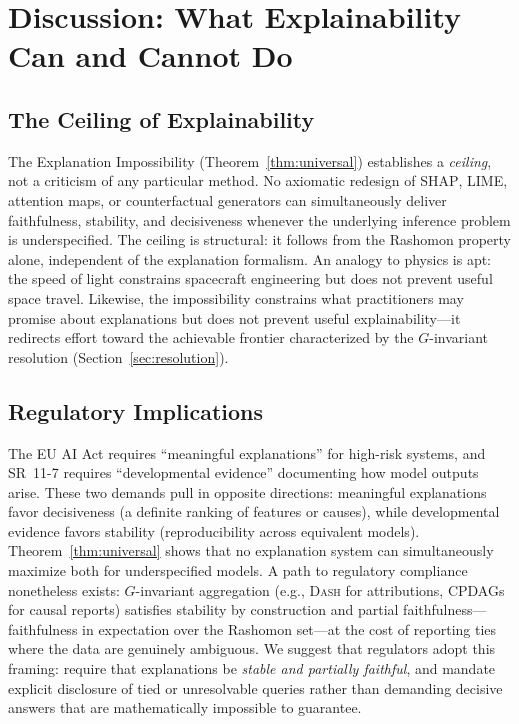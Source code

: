 \documentclass[twoside]{jmlr}
\newcommand{\SHAP}{\textsc{SHAP}}
\newcommand{\DASH}{\textsc{Dash}}
\begin{document}
\section{Discussion: What Explainability Can and Cannot Do}
\label{sec:discussion}

\subsection{The Ceiling of Explainability}
\label{sec:ceiling}

The Explanation Impossibility (Theorem~\ref{thm:universal}) establishes
a \emph{ceiling}, not a criticism of any particular method.  No axiomatic
redesign of \SHAP{}, LIME, attention maps, or counterfactual generators can
simultaneously deliver faithfulness, stability, and decisiveness whenever the
underlying inference problem is underspecified.  The ceiling is structural: it
follows from the Rashomon property alone, independent of the explanation
formalism.  An analogy to physics is apt: the speed of light constrains
spacecraft engineering but does not prevent useful space travel.  Likewise, the
impossibility constrains what practitioners may promise about explanations but
does not prevent useful explainability---it redirects effort toward the
achievable frontier characterized by the $G$-invariant resolution
(Section~\ref{sec:resolution}).

\subsection{Regulatory Implications}
\label{sec:regulatory}

The EU AI Act \citep{euaiact2024} requires ``meaningful explanations'' for
high-risk systems, and SR~11-7 \citep{occ2011sr117} requires ``developmental
evidence'' documenting how model outputs arise.  These two demands pull in
opposite directions: meaningful explanations favor decisiveness (a definite
ranking of features or causes), while developmental evidence favors stability
(reproducibility across equivalent models).  Theorem~\ref{thm:universal} shows
that no explanation system can simultaneously maximize both for underspecified
models.  A path to regulatory compliance nonetheless exists: $G$-invariant
aggregation (e.g., \DASH{} for attributions, CPDAGs for causal reports)
satisfies stability by construction and partial faithfulness---faithfulness in
expectation over the Rashomon set---at the cost of reporting ties where the
data are genuinely ambiguous.  We suggest that regulators adopt this framing:
require that explanations be \emph{stable and partially faithful}, and mandate
explicit disclosure of tied or unresolvable queries rather than demanding
decisive answers that are mathematically impossible to guarantee.
\end{document}
